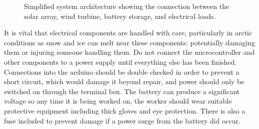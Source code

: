 \documentclass[11pt,a4paper]{article}
\begin{document}
\begin{figure}[H]
\caption{Simplified system architecture showing the connection between the solar array, wind turbine, battery storage, and electrical loads.}
\label{fig:system_architecture}
\end{figure}

It is vital that electrical components are handled with care, particularly in arctic conditions as snow and ice can melt near these components: potentially damaging them or injuring someone handling them. Do not connect the microcontroller and other components to a power supply until everything else has been finished. Connections into the arduino should be double checked in order to prevent a short circuit, which would damage it beyond repair, and power should only be switched on through the terminal box.
The battery can produce a significant voltage so any time it is being worked on, the worker should wear suitable protective equipment including thick gloves and eye protection. There is also a fuse included to prevent damage if a power surge from the battery did occur.
\end{document}
